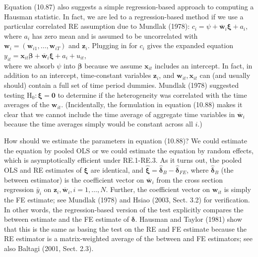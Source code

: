 \documentclass[10pt]{article}
\begin{document}
Equation (10.87) also suggests a simple regression-based approach to computing a Hausman statistic. In fact, we are led to a regression-based method if we use a particular correlated RE assumption due to Mundlak (1978): $c_{i}=\psi+\overline{\mathbf{w}}_{i} \boldsymbol{\xi}+a_{i}$, where $a_{i}$ has zero mean and is assumed to be uncorrelated with $\mathbf{w}_{i}=\left(\mathbf{w}_{i 1}, \ldots, \mathbf{w}_{i T}\right)$ and $\mathbf{z}_{i}$. Plugging in for $c_{i}$ gives the expanded equation\\
$y_{i t}=\mathbf{x}_{i t} \boldsymbol{\beta}+\overline{\mathbf{w}}_{i} \boldsymbol{\xi}+a_{i}+u_{i t}$,\\
where we absorb $\psi$ into $\boldsymbol{\beta}$ because we assume $\mathbf{x}_{i t}$ includes an intercept. In fact, in addition to an intercept, time-constant variables $\mathbf{z}_{i}$, and $\mathbf{w}_{i t}, \mathbf{x}_{i t}$ can (and usually should) contain a full set of time period dummies. Mundlak (1978) suggested testing $\mathrm{H}_{0}: \boldsymbol{\xi}=\mathbf{0}$ to determine if the heterogeneity was correlated with the time averages of the $\mathbf{w}_{i t}$. (Incidentally, the formulation in equation (10.88) makes it clear that we cannot include the time average of aggregate time variables in $\overline{\mathbf{w}}_{i}$ because the time averages simply would be constant across all $i$.)

How should we estimate the parameters in equation (10.88)? We could estimate the equation by pooled OLS or we could estimate the equation by random effects, which is asymptotically efficient under RE.1-RE.3. As it turns out, the pooled OLS and RE estimates of $\boldsymbol{\xi}$ are identical, and $\hat{\boldsymbol{\xi}}=\hat{\boldsymbol{\delta}}_{B}-\hat{\boldsymbol{\delta}}_{F E}$, where $\hat{\boldsymbol{\delta}}_{B}$ (the between estimator) is the coefficient vector on $\overline{\mathbf{w}}_{i}$ from the cross section regression $\bar{y}_{i}$ on $\mathbf{z}_{i}, \overline{\mathbf{w}}_{i}, i=1, \ldots, N$. Further, the coefficient vector on $\mathbf{w}_{i t}$ is simply the FE estimate; see Mundlak (1978) and Hsiao (2003, Sect. 3.2) for verification. In other words, the regression-based version of the test explicitly compares the between estimate and the FE estimate of $\boldsymbol{\delta}$. Hausman and Taylor (1981) show that this is the same as basing the test on the RE and FE estimate because the RE estimator is a matrix-weighted average of the between and FE estimators; see also Baltagi (2001, Sect. 2.3).
\end{document}
